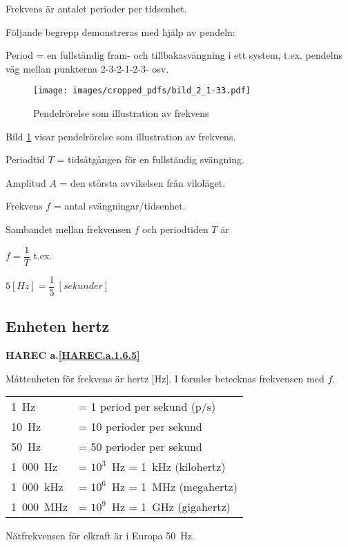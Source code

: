 Frekvens är antalet perioder per tidsenhet.

Följande begrepp demonstreras med hjälp av pendeln:

Period = en fullständig fram- och tillbakasvängning i ett system, t.ex.
pendelns väg mellan punkterna 2-3-2-1-2-3- osv.

\begin{figure}[ht]
\texttt{[image: images/cropped\_pdfs/bild\_2\_1-33.pdf]}
\caption{Pendelrörelse som illustration av frekvens}
\label{fig:BildII1-33}
\end{figure}

Bild \ref{fig:BildII1-33} visar pendelrörelse som illustration av frekvens.

Periodtid \(T\) = tidsåtgången för en fullständig svängning.

Amplitud \(A\) = den största avvikelsen från viloläget.

Frekvens \(f\) = antal svängningar/tidsenhet.

Sambandet mellan frekvensen \(f\) och periodtiden \(T\) är

\(f=\dfrac{1}{T}\) t.ex.

\(5 [H z] = \dfrac{1}{5}\ [sekunder]\)

\subsection{Enheten hertz}
\textbf{HAREC a.\ref{HAREC.a.1.6.5}\label{myHAREC.a.1.6.5}}

Måttenheten för frekvens är hertz [Hz].
I formler betecknas frekvensen med \(f\).

\begin{center}
\begin{tabular}{ll}
1~Hz      & = 1 period per sekund (p/s) \\
10~Hz     & = 10 perioder per sekund \\
50~Hz     & = 50 perioder per sekund \\
1~000~Hz  & = \(10^3\)~Hz = 1~kHz (kilohertz) \\
1~000~kHz & = \(10^6\)~Hz = 1~MHz (megahertz) \\
1~000~MHz & = \(10^9\)~Hz = 1~GHz (gigahertz) \\
\end{tabular}
\end{center}

Nätfrekvensen för elkraft är i Europa 50~Hz.


